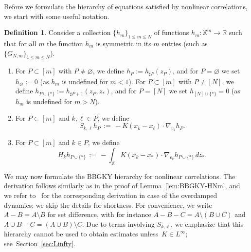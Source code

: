 \documentclass[a4paper,11pt,reqno,noindent]{amsart}
\theoremstyle{plain}
\theoremstyle{definition}
\newtheorem{defin}[theor]{Definition}
\numberwithin{equation}{section}
\newcommand{\Xd}{\mathbb X}
\newcommand{\R}{\mathbb R}
\begin{document}
Before we formulate the hierarchy of equations satisfied by nonlinear correlations, we start with some useful notation.

\begin{defin}
Consider a collection $\{h_m\}_{1\le m\le N}$ of functions $h_m:\Xd^m\to\R$ such that for all $m$ the function $h_m$ is symmetric in its $m$ entries (such as $\{G_{N,m}\}_{1\le m\le N}$).
\begin{enumerate}[---]
\item For $P\subset[ m]$ with $P\ne\varnothing$, we define $h_P:=h_{\sharp P}(z_P)$, and for $P=\varnothing$ we set $h_\varnothing:=0$ (as $h_m$ is undefined for $m<1$).
For $P\subset[ m]$ with $P\ne[ N]$, we define $h_{P\cup\{*\}}:=h_{\sharp P+1}(z_P,z_*)$, and for $P=[ N]$ we set $h_{[ N]\cup\{*\}}=0$ (as $h_m$ is undefined for $m>N$).
\smallskip\item For $P\subset[ m]$ and $k,\ell\in P$, we define
\[S_{k,\ell}h_P\,:=\,-K(x_k - x_\ell) \cdot \nabla_{v_k} h_P.\]
\item For $P\subset[ m]$ and $k\in P$, we define
\[H_kh_{P\cup\{*\}}\,:=\,-\int_{\Xd}K(x_k-x_*)\cdot\nabla_{v_k}h_{P\cup\{*\}}\,dz_*.\]
\end{enumerate}
\end{defin}

We may now formulate the BBGKY hierarchy for nonlinear correlations. The derivation follows similarly as in the proof of Lemma~\ref{lem:BBGKY-HNm}, and we refer to~\cite[Section~4]{Hess_Childs_2023} for the corresponding derivation in case of the overdamped dynamics; we skip the details for shortness. For convenience, we write $A-B=A\setminus B$ for set difference, with for instance $A-B-C=A\setminus(B\cup C)$ and $A\cup B-C=(A\cup B)\setminus C$.
Due to terms involving $S_{k,\ell}$, we emphasize that this hierarchy cannot be used to obtain estimates unless~$K\in L^\infty$; see~Section~\ref{sec:Linfty}.
\end{document}
